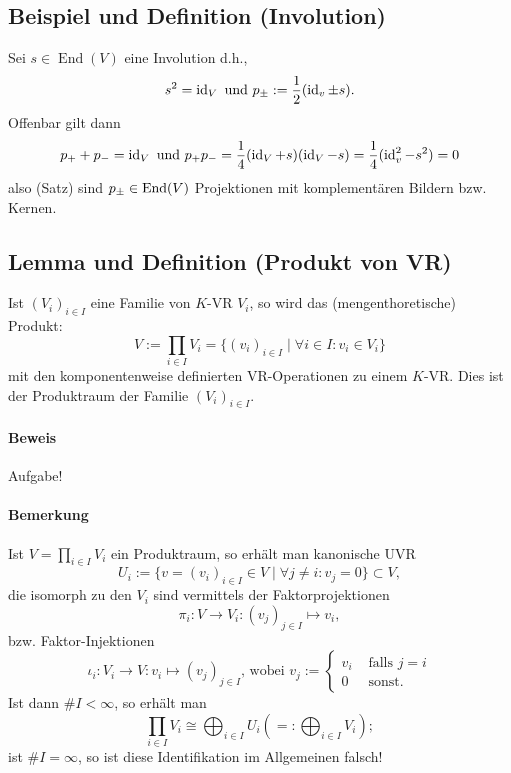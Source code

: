 \subsection{Beispiel und Definition (Involution)}	
	\begin{Definition}[Definition]
		Sei $s\in \operatorname{End}(V)$ eine Involution d.h., 
		\[ s^2 = \operatorname{id}_V \text{ und } p_\pm := \frac{1}{2}(\operatorname{id}_v\pm s). \]
	Offenbar gilt dann
		\[ p_{+} + p_{-} = \operatorname{id}_V \text{ und } p_+ p_{-} = \frac{1}{4}(\operatorname{id}_V +s)(\operatorname{id}_V -s) =  \frac{1}{4}(\operatorname{id}_v^2-s^2)=0 \]
	also (Satz) sind $p_\pm\in\operatorname{End}(V)$ Projektionen mit komplementären Bildern bzw. Kernen.
	\end{Definition}
		
\subsection{Lemma und Definition (Produkt von VR)}
	\begin{Definition}
		Ist $(V_i)_{i\in I}$ eine Familie von $ K $-VR $V_i$, so wird das (mengenthoretische) Produkt:
		\[V:= \prod_{i\in I}V_i=\{(v_i)_{i\in I}\mid\forall i\in I:v_i\in V_i\}\]
	mit den komponentenweise definierten VR-Operationen zu einem $ K $-VR. Dies ist der Produktraum der Familie	$(V_i)_{i\in I}$.
	\end{Definition}
		
\paragraph{Beweis} Aufgabe!

\paragraph{Bemerkung} 
	Ist $V = \prod_{i\in I} V_i$ ein Produktraum, so erhält man kanonische UVR
		\[U_i:=\{v=(v_i)_{i\in I}\in V\mid\forall j \neq i:v_j = 0\}\subset V,\]
	die isomorph zu den $V_i$ sind vermittels der Faktorprojektionen
		\[\pi_i:V\to V_i:(v_j)_{j\in I} \mapsto v_i,\]
	bzw.  Faktor-Injektionen
		\[\iota_i:V_i\to V: v_i \mapsto(v_j)_{j\in I}\text{, wobei }v_j :=
			\begin{cases}
				v_i &\text{ falls } j=i\\
				0 &\text{ sonst.}
			\end{cases}
		\]
	Ist dann $\# I < \infty$, so erhält man
		\[\prod_{i\in I} V_i\cong \bigoplus_{i\in I}U_i (=: \bigoplus_{i\in I}V_i);\]
	ist $\#I=\infty$, so ist diese Identifikation im Allgemeinen falsch!
	
